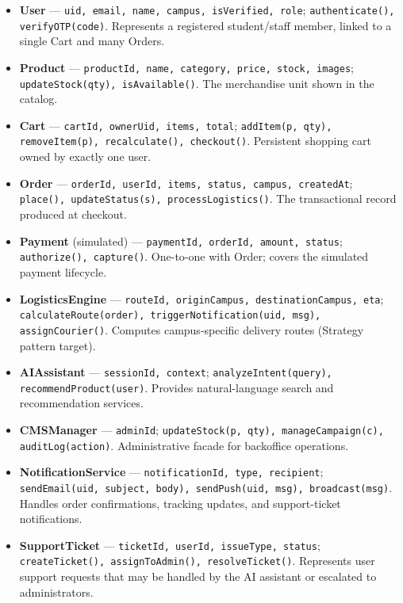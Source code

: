 \documentclass[11pt,a4paper]{article}
\begin{document}
\begin{itemize}
    \item \textbf{User} --- \texttt{uid, email, name, campus, isVerified, role}; \texttt{authenticate(), verifyOTP(code)}. Represents a registered student/staff member, linked to a single Cart and many Orders.
    \item \textbf{Product} --- \texttt{productId, name, category, price, stock, images}; \texttt{updateStock(qty), isAvailable()}. The merchandise unit shown in the catalog.
    \item \textbf{Cart} --- \texttt{cartId, ownerUid, items, total}; \texttt{addItem(p, qty), removeItem(p), recalculate(), checkout()}. Persistent shopping cart owned by exactly one user.
    \item \textbf{Order} --- \texttt{orderId, userId, items, status, campus, createdAt}; \texttt{place(), updateStatus(s), processLogistics()}. The transactional record produced at checkout.
    \item \textbf{Payment} (simulated) --- \texttt{paymentId, orderId, amount, status}; \texttt{authorize(), capture()}. One-to-one with Order; covers the simulated payment lifecycle.
    \item \textbf{LogisticsEngine} --- \texttt{routeId, originCampus, destinationCampus, eta}; \texttt{calculateRoute(order), triggerNotification(uid, msg), assignCourier()}. Computes campus-specific delivery routes (Strategy pattern target).
    \item \textbf{AIAssistant} --- \texttt{sessionId, context}; \texttt{analyzeIntent(query), recommendProduct(user)}. Provides natural-language search and recommendation services.
    \item \textbf{CMSManager} --- \texttt{adminId}; \texttt{updateStock(p, qty), manageCampaign(c), auditLog(action)}. Administrative facade for backoffice operations.
    \item \textbf{NotificationService} --- \texttt{notificationId, type, recipient};
    \texttt{sendEmail(uid, subject, body), sendPush(uid, msg), broadcast(msg)}.
    Handles order confirmations, tracking updates, and support-ticket notifications.

    \item \textbf{SupportTicket} --- \texttt{ticketId, userId, issueType, status};
\texttt{createTicket(), assignToAdmin(), resolveTicket()}.
Represents user support requests that may be handled by the AI assistant or escalated to administrators.
\end{itemize}
\end{document}
